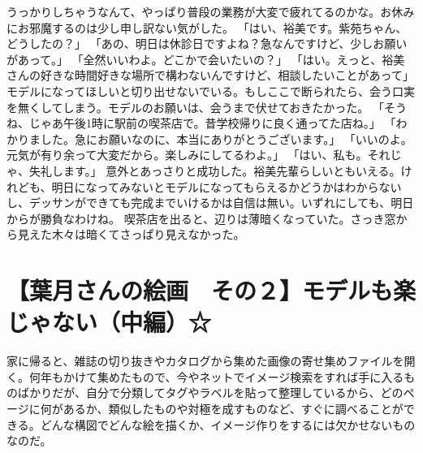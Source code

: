うっかりしちゃうなんて、やっぱり普段の業務が大変で疲れてるのかな。お休みにお邪魔するのは少し申し訳ない気がした。
「はい、裕美です。紫苑ちゃん、どうしたの？」
「あの、明日は休診日ですよね？急なんですけど、少しお願いがあって。」
「全然いいわよ。どこかで会いたいの？」
「はい。えっと、裕美さんの好きな時間好きな場所で構わないんですけど、相談したいことがあって」
モデルになってほしいと切り出せないでいる。もしここで断られたら、会う口実を無くしてしまう。モデルのお願いは、会うまで伏せておきたかった。
「そうね、じゃあ午後1時に駅前の喫茶店で。昔学校帰りに良く通ってた店ね。」
「わかりました。急にお願いなのに、本当にありがとうございます。」
「いいのよ。元気が有り余って大変だから。楽しみにしてるわよ。」
「はい、私も。それじゃ、失礼します。」
意外とあっさりと成功した。裕美先輩らしいともいえる。けれども、明日になってみないとモデルになってもらえるかどうかはわからないし、デッサンができても完成までいけるかは自信は無い。いずれにしても、明日からが勝負なわけね。
喫茶店を出ると、辺りは薄暗くなっていた。さっき窓から見えた木々は暗くてさっぱり見えなかった。


\section{【葉月さんの絵画　その２】モデルも楽じゃない（中編）☆}

家に帰ると、雑誌の切り抜きやカタログから集めた画像の寄せ集めファイルを開く。何年もかけて集めたもので、今やネットでイメージ検索をすれば手に入るものばかりだが、自分で分類してタグやラベルを貼って整理しているから、どのページに何があるか、類似したものや対極を成すものなど、すぐに調べることができる。どんな構図でどんな絵を描くか、イメージ作りをするには欠かせないものなのだ。

